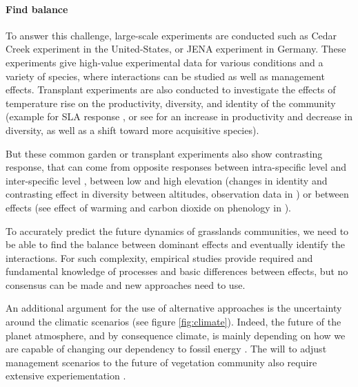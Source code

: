  \paragraph{Find balance}
 
 
 
 To answer this challenge, large-scale experiments are conducted such as Cedar Creek experiment in the United-States, or JENA experiment in Germany. These experiments give high-value experimental data for various conditions and a variety of species, where interactions can be studied as well as management effects. Transplant experiments are also conducted to investigate the effects of temperature rise on the productivity, diversity, and identity of the community (example for SLA response \cite{scheepens_genotypic_2010}, or see \cite{debouk_functional_2015} for an increase in productivity and decrease in diversity, as well as a shift toward more acquisitive species).
 
 But these common garden or transplant experiments also show contrasting response, that can come from opposite responses between intra-specific level and inter-specific level \parencite{jung_intraspecific_2014}, between low and high elevation (changes in identity and contrasting effect in diversity between altitudes, observation data in \cite{rosbakh_elevation_2014}) or between effects (see effect of warming and carbon dioxide on phenology in \cite{reyes-fox_five_2016}).
 
 To accurately predict the future dynamics of grasslands communities, we need to be able to find the balance between dominant effects and eventually identify the interactions. For such complexity, empirical studies provide required and fundamental knowledge of processes and basic differences between effects, but no consensus can be made \parencite{merila_climate_2014} and new approaches need to use.
 
 An additional argument for the use of alternative approaches is the uncertainty around the climatic scenarios (see figure \ref{fig:climate}). Indeed, the future of the planet atmosphere, and by consequence climate, is mainly depending on how we are capable of changing our dependency to fossil energy \parencite{intergovernmental_panel_on_climate_change_climate_2014}. The will to adjust management scenarios to the future of vegetation community \parencite{schipe_multiple_2012} also require extensive experiementation \parencite{rodriguez_lingra-cc:_1999, martin_simulations_2012, deleglise_drought-induced_2015}.
 
